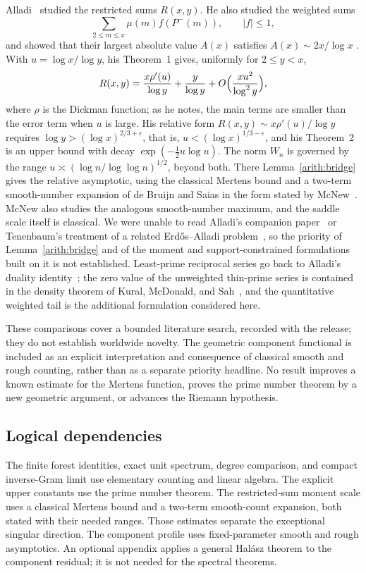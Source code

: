 Alladi~\cite{alladi1982} studied the restricted sums $R(x,y)$. He also studied the weighted sums
\[
 \sum_{2\le m\le x}\mu(m)f(P^-(m)),\qquad |f|\le1,
\]
and showed that their largest absolute value $A(x)$ satisfies $A(x)\sim2x/\log x$ \cite[Theorem~3]{alladi1982}. With $u=\log x/\log y$, his Theorem~1 gives, uniformly for $2\le y<x$,
\[
 R(x,y)=\frac{x\rho'(u)}{\log y}+\frac{y}{\log y}+O\Bigl(\frac{xu^2}{\log^2y}\Bigr),
\]
where $\rho$ is the Dickman function; as he notes, the main terms are smaller than the error term when $u$ is large. His relative form $R(x,y)\sim x\rho'(u)/\log y$ \cite[(2.16)]{alladi1982} requires $\log y>(\log x)^{2/3+\varepsilon}$, that is, $u<(\log x)^{1/3-\varepsilon}$, and his Theorem~2 is an upper bound with decay $\exp(-\tfrac12u\log u)$. The norm $W_n$ is governed by the range $u\asymp(\log n/\log\log n)^{1/2}$, beyond both. There Lemma~\ref{arith:bridge} gives the relative asymptotic, using the classical Mertens bound and a two-term smooth-number expansion of de Bruijn and Saias in the form stated by McNew~\cite{mcnew}. McNew also studies the analogous smooth-number maximum, and the saddle scale itself is classical. We were unable to read Alladi's companion paper~\cite{alladi1982b} or Tenenbaum's treatment of a related Erd\H{o}s--Alladi problem~\cite{tenenbaum1990}, so the priority of Lemma~\ref{arith:bridge} and of the moment and support-constrained formulations built on it is not established. Least-prime reciprocal series go back to Alladi's duality identity~\cite{alladi1977}; the zero value of the unweighted thin-prime series is contained in the density theorem of Kural, McDonald, and Sah~\cite{kms}, and the quantitative weighted tail is the additional formulation considered here.

These comparisons cover a bounded literature search, recorded with the release; they do not establish worldwide novelty. The geometric component functional is included as an explicit interpretation and consequence of classical smooth and rough counting, rather than as a separate priority headline. No result improves a known estimate for the Mertens function, proves the prime number theorem by a new geometric argument, or advances the Riemann hypothesis.

\subsection{Logical dependencies}

The finite forest identities, exact unit spectrum, degree comparison, and compact inverse-Gram limit use elementary counting and linear algebra. The explicit upper constants use the prime number theorem. The restricted-sum moment scale uses a classical Mertens bound and a two-term smooth-count expansion, both stated with their needed ranges. Those estimates separate the exceptional singular direction. The component profile uses fixed-parameter smooth and rough asymptotics. An optional appendix applies a general Hal\'asz theorem to the component residual; it is not needed for the spectral theorems.

